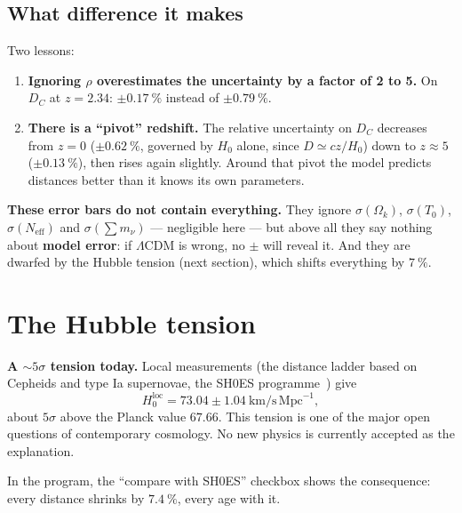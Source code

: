 \documentclass[11pt,a4paper,openany]{report}
\newcommand{\Mpc}{\text{Mpc}}
\newcommand{\kms}{\si{\km\per\second}}
\newcommand{\Hzero}{H_{0}}
\newcommand{\Ok}{\Omega_{k}}
\begin{document}
\subsection{What difference it makes}



\noindent Two lessons:

\begin{enumerate}[topsep=3pt]
\item \textbf{Ignoring $\rho$ overestimates the uncertainty by a factor of 2 to
5.} On $D_{C}$ at $z = 2.34$: $\pm0.17~\%$ instead of $\pm0.79~\%$.
\item \textbf{There is a “pivot” redshift.} The relative uncertainty on
$D_{C}$ decreases from $z=0$ ($\pm0.62~\%$, governed by $\Hzero$ alone, since
$D \simeq cz/\Hzero$) down to $z \approx 5$ ($\pm0.13~\%$), then rises again
slightly. Around that pivot the model predicts distances better than it knows
its own parameters.
\end{enumerate}

\begin{tcolorbox}[warning]
\textbf{These error bars do not contain everything.} They ignore
$\sigma(\Ok)$, $\sigma(T_{0})$, $\sigma(N_{\text{eff}})$ and
$\sigma(\sum m_{\nu})$ --- negligible here --- but above all they say nothing
about \textbf{model error}: if $\Lambda$CDM is wrong, no $\pm$ will reveal it.
And they are dwarfed by the Hubble tension (next section), which shifts
everything by $7~\%$.
\end{tcolorbox}

\section{The Hubble tension}

\begin{tcolorbox}[warning]
\textbf{A $\sim 5\sigma$ tension today.} Local measurements (the distance
ladder based on Cepheids and type Ia supernovae, the SH0ES
programme~\cite{Riess2022}) give
\[
\Hzero^{\text{loc}} = 73.04 \pm 1.04~\kms\,\Mpc^{-1},
\]
about $5\sigma$ above the Planck value $67.66$. This tension is one of the
major open questions of contemporary cosmology. No new physics is currently
accepted as the explanation.

\medskip
In the program, the “compare with SH0ES” checkbox shows the consequence:
every distance shrinks by $7.4~\%$, every age with it.
\end{tcolorbox}
\end{document}
